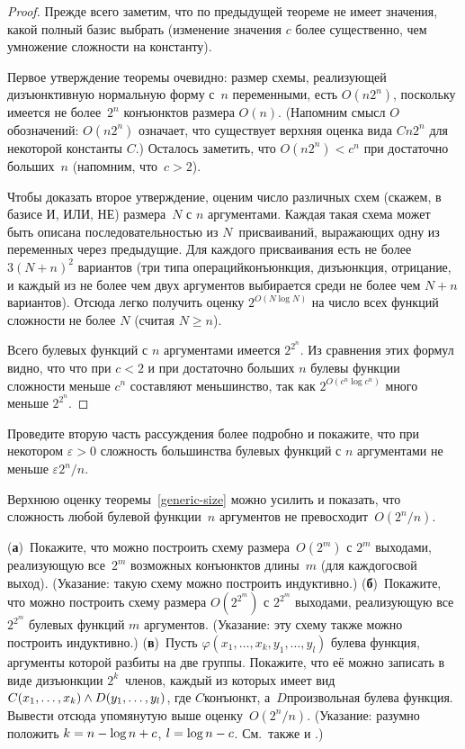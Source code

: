 \begin{proof}
Прежде всего заметим, что по предыдущей теореме не имеет значения,
какой полный базис выбрать (изменение значения $c$ более существенно,
чем умножение сложности на константу).

Первое утверждение теоремы очевидно: размер схемы, реализующей
дизъюнктивную нормальную форму%
с~$n$ переменными, есть
$O(n2^n)$, поскольку имеется не более~$2^n$ конъюнктов размера
$O(n)$. (Напомним смысл $O$\д обозначений: $O(n2^n)$ означает,
что существует верхняя оценка вида $Cn2^n$ для некоторой
константы $C$.) Осталось заметить, что $O(n2^n)<c^n$ при достаточно
больших~$n$ (напомним, что~$c>2$).

Чтобы доказать второе утверждение, оценим число различных схем
(скажем, в базисе И, ИЛИ, НЕ) размера~$N$ с
$n$ аргументами. Каждая такая схема может быть
описана последовательностью из $N$~присваиваний, выражающих одну из
переменных через предыдущие. Для каждого присваивания есть не более
$3(N+n)^2$ вариантов (три типа операций\т конъюнкция,
дизъюнкция, отрицание, и каждый из не более чем двух аргументов
выбирается среди не более чем $N+n$ вариантов). Отсюда легко
получить оценку $2^{O(N\log N)}$ на число всех функций сложности не
более $N$ (считая $N\ge n$).

Всего булевых функций с $n$ аргументами имеется $2^{2^n}$. Из
сравнения этих формул видно, что что при $c<2$ и при достаточно
больших $n$ булевы функции сложности меньше $c^n$ составляют
меньшинство, так как
        $
2^{O(c^n\log c^n)}
        $
много меньше $2^{2^n}$.
\end{proof}

\begin{problem}
Проведите вторую часть рассуждения более подробно и покажите, что
при некотором ${\varepsilon>0}$ сложность большинства булевых
функций с $n$ аргументами не меньше $\varepsilon2^n/n$.
\end{problem}

Верхнюю оценку теоремы~\ref{generic-size} можно усилить и
показать, что сложность любой булевой функции~$n$ аргументов не
превосходит~$O(2^n/n)$.

\begin{problem}
(\textbf{а})~Покажите, что можно построить схему
размера~$O(2^m)$ с $2^m$ выходами, реализующую все~$2^m$ возможных
конъюнктов длины~$m$ (для каждого\т свой выход). (Указание:
такую схему можно построить индуктивно.)
(\textbf{б})~Покажите, что можно построить схему размера
$O(2^{2^m})$ с $2^{2^m}$ выходами, реализующую все~$2^{2^m}$
булевых функций $m$ аргументов. (Указание: эту схему также
можно построить индуктивно.)
(\textbf{в})~Пусть $\varphi(x_1,\dots,x_k,y_1,\dots,y_l)$\т
булева функция, аргументы которой разбиты на две группы.
Покажите, что её можно записать в виде дизъюнкции $2^k$~членов,
каждый из которых имеет вид $C(x_1,\dots,x_k)\hm\land
D(y_1,\dots,y_l)$, где $C$\т конъюнкт, а~$D$\т произвольная
булева функция. Вывести отсюда упомянутую выше
оценку~$O(2^n/n)$. (Указание: разумно положить $k\hm={n\hm-\log
n+c}$, $l\hm={\log n-c}$. См.~также \cite{gindikin} и
\cite{cyber}.)
\end{problem}

